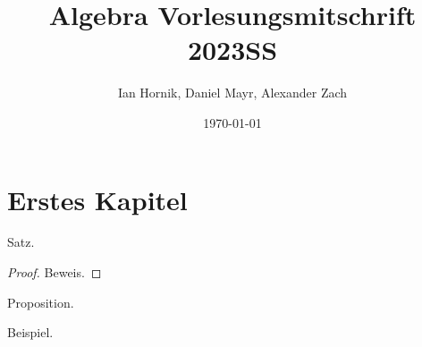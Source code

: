 \documentclass{lecture-notes}
\title{Algebra Vorlesungsmitschrift 2023SS}
\author{Ian Hornik, Daniel Mayr, Alexander Zach}
\date{\today}
\begin{document}
\maketitle
\tableofcontents

\chapter{Erstes Kapitel}

\begin{theorem}
    Satz.
\end{theorem}

\begin{proof}
    Beweis.
\end{proof}

\begin{proposition}
    Proposition.
\end{proposition}

\begin{example}
    Beispiel.
\end{example}
\end{document}
